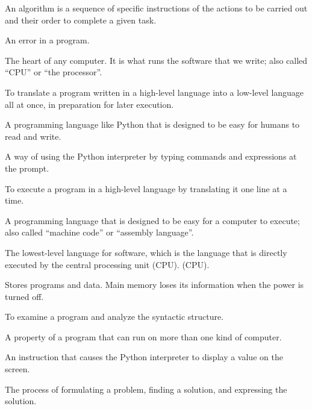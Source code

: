 \begin{description}
\tightlist
\item[algorithm]
An algorithm is a sequence of specific instructions of the actions to be carried out and their order to complete a given task. 
\item[bug]
An error in a program. 
\item[central processing unit]
The heart of any computer. It is what runs the software that we write; also called ``CPU'' or ``the processor''.
 
\item[compile]
To translate a program written in a high-level language into a low-level language all at once, in preparation for later execution.
\item[high-level language]
A programming language like Python that is designed to be easy for humans to read and write.
\item[interactive mode]
A way of using the Python interpreter by typing commands and expressions at the prompt.
\item[interpret]
To execute a program in a high-level language by translating it one line at a time. 
\item[low-level language]
A programming language that is designed to be easy for a computer to execute; also called ``machine code'' or ``assembly language''.
\item[machine code]
The lowest-level language for software, which is the language that is directly executed by the central processing unit (CPU).
(CPU). 
\item[main memory]
Stores programs and data. Main memory loses its information when the power is turned off.
\item[parse]
To examine a program and analyze the syntactic structure.
\item[portability]
A property of a program that can run on more than one kind of computer. 
\item[print function]
An instruction that causes the Python interpreter to display a value on the screen.  
\item[problem solving]
The process of formulating a problem, finding a solution, and expressing the solution. 

\end{description}
